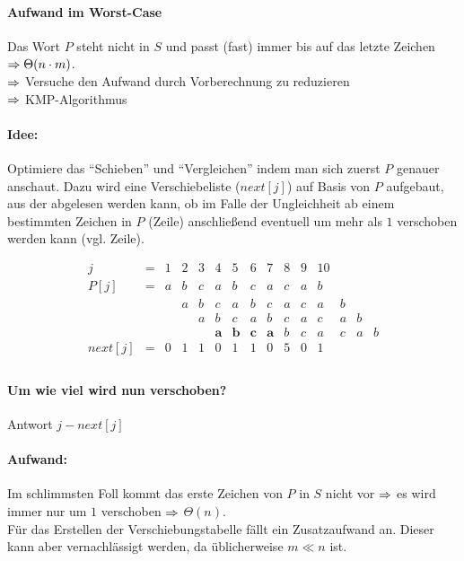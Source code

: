 \documentclass[a4paper,twoside,DIV15,BCOR12mm]{scrbook}
\begin{document}
\paragraph{Aufwand im Worst-Case}

Das Wort $P$ steht nicht in $S$ und passt (fast) immer bis auf das letzte Zeichen $\Rightarrow \Theta(n \cdot m)$.\\
$\Rightarrow$ Versuche den Aufwand durch Vorberechnung zu reduzieren\\
$\Rightarrow$ KMP-Algorithmus

\paragraph{Idee:} Optimiere das "`Schieben"' und "`Vergleichen"' indem man sich zuerst $P$ genauer anschaut.
Dazu wird eine Verschiebeliste ($next[j]$) auf Basis von $P$ aufgebaut, aus der abgelesen werden kann, ob im 
Falle der Ungleichheit ab einem bestimmten Zeichen in $P$ (Zeile) anschließend eventuell um mehr als $1$ 
verschoben werden kann (vgl. Zeile).

$$\begin{array}{ccccccccccccccc}
    j  & = & 1 & 2 & 3 & 4 & 5 & 6 & 7 & 8 & 9 & 10 \\
	P[j] & = & a & b & c & a & b & c & a & c & a & b \\
       &   &   & a & b & c & a & b & c & a & c & a & b \\
       &   &   &   & a & b & c & a & b & c & a & c & a & b \\
       &   &   &   &   & \textbf{a} & \textbf{b} & \textbf{c} & \textbf{a} & b & c & a & c & a & b \\
  next[j]& = & 0 & 1 & 1 & 0 & 1 & 1 & 0 & 5 & 0 & 1 \\
\end{array}$$

\paragraph{Um wie viel wird nun verschoben?} Antwort $j - next[j]$

\paragraph{Aufwand:}
	Im schlimmsten Foll kommt das erste Zeichen von $P$ in $S$ nicht vor $\Rightarrow$ es wird immer nur um $1$ verschoben
	$\Rightarrow$ $\Theta(n)$.\\
	Für das Erstellen der Verschiebungstabelle fällt ein Zusatzaufwand an. Dieser kann aber vernachlässigt werden, da
	üblicherweise $m \ll n$ ist.
	
\end{document}
